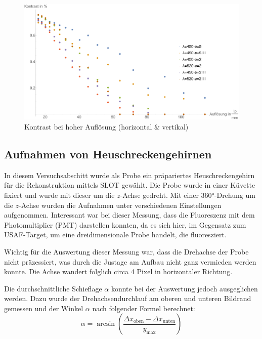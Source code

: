 \begin{figure}[H]
\centering
\includegraphics[width=1.0\linewidth]{IMAGE/Versuch2Plot2_all.pdf}
	\caption{Kontrast bei hoher Auflösung (horizontal \& vertikal)}
	\label{fig:Versuch2_Plot2_all}
\end{figure}



\subsection{Aufnahmen von Heuschreckengehirnen}
In diesem Versuchsabschitt wurde als Probe ein präpariertes Heuschreckengehirn für die Rekonstruktion mittels SLOT gewählt.
Die Probe wurde in einer Küvette fixiert und wurde mit dieser um die $z$-Achse gedreht.
Mit einer 360°-Drehung um die $z$-Achse wurden die Aufnahmen unter verschiedenen Einstellungen aufgenommen.
Interessant war bei dieser Messung, dass die Fluoreszenz mit dem Photomultiplier (PMT) darstellen konnten, da es sich hier, im Gegensatz zum USAF-Target, um eine dreidimensionale Probe handelt, die fluoresziert.

Wichtig für die Auswertung dieser Messung war, dass die Drehachse der Probe nicht präzessiert, was durch die Justage am Aufbau nicht ganz vermieden werden konnte.
Die Achse wandert folglich circa 4 Pixel in horizontaler Richtung.

Die durchschnittliche Schieflage $\alpha$ konnte bei der Auswertung jedoch ausgeglichen werden.
Dazu wurde der Drehachsendurchlauf am oberen und unteren Bildrand gemessen und der Winkel $\alpha$ nach folgender Formel berechnet:
$$\alpha = \arcsin \left( \frac{\Delta{x_{\text{oben}}} - \Delta{x_{\text{unten}}}}{y_{\text{max}}} \right)$$

